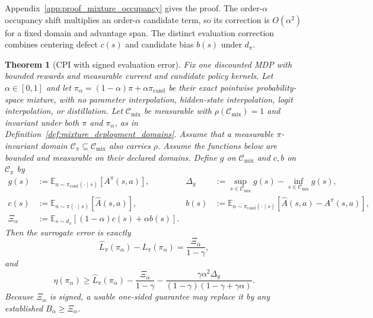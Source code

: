 \documentclass{article}
\theoremstyle{plain}
\newtheorem{theorem}{Theorem}[section]
\theoremstyle{definition}
\theoremstyle{remark}
\newcommand{\E}{\mathbb{E}}
\begin{document}
Appendix~\ref{app:proof_mixture_occupancy} gives the proof. The
order-$\alpha$ occupancy shift multiplies an order-$\alpha$ candidate term,
so its correction is $O(\alpha^2)$ for a fixed domain and advantage span.
The distinct evaluation correction combines centering defect $c(s)$ and
candidate bias $b(s)$ under $d_\pi$.

\begin{theorem}[CPI with signed evaluation error]
\label{thm:monotone_with_error}
Fix one discounted MDP with bounded rewards and measurable current and
candidate policy kernels. Let $\alpha\in[0,1]$ and let
$\pi_\alpha=(1-\alpha)\pi+\alpha\pi_{\mathrm{cand}}$ be their exact
pointwise probability-space mixture, with no parameter interpolation,
hidden-state interpolation, logit interpolation, or distillation. Let
$\mathcal C_{\mathrm{mix}}$ be measurable with
$\rho(\mathcal C_{\mathrm{mix}})=1$ and invariant under both $\pi$ and
$\pi_\alpha$, as in Definition~\ref{def:mixture_deployment_domains}. Assume
that a measurable $\pi$-invariant domain
$\mathcal C_\pi\subseteq\mathcal C_{\mathrm{mix}}$ also carries $\rho$.
Assume the functions below are bounded and measurable on their declared
domains. Define $g$ on $\mathcal C_{\mathrm{mix}}$ and $c,b$ on
$\mathcal C_\pi$ by
\begin{align}
g(s)
&:=\E_{a\sim\pi_{\mathrm{cand}}(\cdot\mid s)}[A^\pi(s,a)],
&
\Delta_g
&:=\sup_{s\in\mathcal C_{\mathrm{mix}}}g(s)
-\inf_{s\in\mathcal C_{\mathrm{mix}}}g(s),
\label{eq:g_span_def}\\
c(s)
&:=\E_{a\sim\pi(\cdot\mid s)}[\widehat A(s,a)],
&
b(s)
&:=\E_{a\sim\pi_{\mathrm{cand}}(\cdot\mid s)}
[\widehat A(s,a)-A^\pi(s,a)],
\label{eq:signed_defects}\\
\Xi_\alpha
&:=\E_{s\sim d_\pi}[(1-\alpha)c(s)+\alpha b(s)].
\label{eq:Xi_alpha}
\end{align}
Then the surrogate error is exactly
\begin{equation}
\widehat L_\pi(\pi_\alpha)-L_\pi(\pi_\alpha)
=\frac{\Xi_\alpha}{1-\gamma},
\label{eq:surrogate_signed_identity}
\end{equation}
and
\begin{equation}
\eta(\pi_\alpha)
\ge
\widehat L_\pi(\pi_\alpha)
-\frac{\Xi_\alpha}{1-\gamma}
-\frac{\gamma\alpha^2\Delta_g}
{(1-\gamma)(1-\gamma+\gamma\alpha)}.
\label{eq:main_theorem_occupancy}
\end{equation}
Because $\Xi_\alpha$ is signed, a usable one-sided guarantee may replace it
by any established $B_\alpha\ge\Xi_\alpha$.


\end{theorem}
\end{document}
